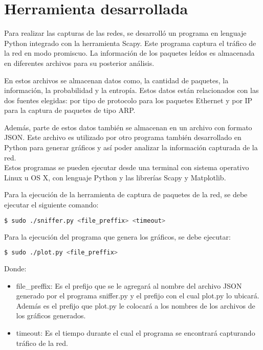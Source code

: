 \section{Herramienta desarrollada}

Para realizar las capturas de las redes, se desarrolló un programa en lenguaje Python integrado con la herramienta Scapy.
Este programa captura el tráfico de la red en modo promiscuo. La información de los paquetes leídos es almacenada en diferentes archivos para su posterior análisis.

En estos archivos se almacenan datos como, la cantidad de paquetes, la información, la probabilidad y la entropía. Estos datos están relacionados con las dos fuentes elegidas: por tipo de protocolo para los paquetes Ethernet y por IP para la captura de paquetes de tipo ARP.

Además, parte de estos datos también se almacenan en un archivo con formato JSON. Este archivo es utilizado por otro programa también desarrollado en Python para generar gráficos y así poder analizar la información capturada de la red.
\\

Estos programas se pueden ejecutar desde una terminal con sistema operativo Linux u OS X, con lenguaje Python y las librerías Scapy y Matplotlib.

Para la ejecución de la herramienta de captura de paquetes de la red, se debe ejecutar el siguiente comando:

\begin{lstlisting}[language=bash]
  $ sudo ./sniffer.py <file_preffix> <timeout> 
\end{lstlisting}

Para la ejecución del programa que genera los gráficos, se debe ejecutar:

\begin{lstlisting}[language=bash]
  $ sudo ./plot.py <file_preffix> 
\end{lstlisting}

Donde:

\begin{itemize}
\item file\_preffix: Es el prefijo que se le agregará al nombre del archivo JSON generado por el programa sniffer.py y el prefijo con el cual plot.py lo ubicará. Además es el prefijo que plot.py le colocará a los nombres de los archivos de los gráficos generados.
\item timeout: Es el tiempo durante el cual el programa se encontrará capturando tráfico de la red.
\end{itemize}